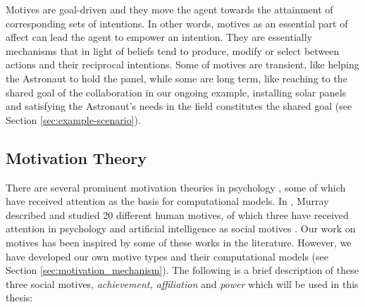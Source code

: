 \documentclass[12pt]{report}
\begin{document}
Motives are goal-driven and they move the agent towards the attainment of
corresponding sets of intentions. In other words, motives as an essential part
of affect can lead the agent to empower an intention. They are essentially
mechanisms that in light of beliefs tend to produce, modify or select between
actions and their reciprocal intentions. Some of motives are transient, like
helping the Astronaut to hold the panel, while some are long term, like reaching
to the shared goal of the collaboration in our ongoing example, installing
solar panels and satisfying the Astronaut's needs in the field constitutes
the shared goal (see Section \ref{sec:example-scenario}).

\subsection{Motivation Theory}
\label{section-motivation-theory}

There are several prominent motivation theories in psychology
\cite{beck:motivation, graham:motivation, laming:understanding-motivation}, some
of which have received attention as the basis for computational models. In
\cite{murray:personality-exploration}, Murray described and studied 20 different
human motives, of which three have received attention in psychology and
artificial intelligence as social motives
\cite{merrick:acheievement-affiliation-power,
zurbriggen:linking-motives-emotions}. Our work on motives has been inspired by
some of these works in the literature. However, we have developed our own motive
types and their computational models (see Section
\ref{sec:motivation_mechanism}). The following is a brief description of these
three social motives, \textit{achievement, affiliation} and \textit{power}
\cite{atkinson:motives-action-society,zurbriggen:linking-motives-emotions}
which will be used in this thesis:
\end{document}
